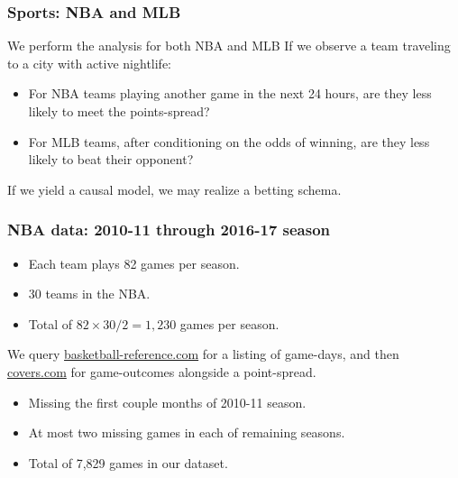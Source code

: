 \documentclass{beamer}
\begin{document}
  


\begin{frame}   \frametitle{Sports: NBA and MLB}
  \begin{block}{We perform the analysis for both NBA and MLB}     
    If we observe a team traveling to a city with active nightlife:
    \vspace{12pt}
    \begin{itemize}       \item For NBA teams playing another game in the next 24 hours, are they less likely to meet the points-spread?
      \item For MLB teams, after conditioning on the odds of winning, are they less likely to beat their opponent?     \end{itemize}
    \vspace{12pt}\begin{block}{If we yield a causal model, we may realize a betting schema.}     
\end{block}
  \end{block} 
\end{frame}

\begin{frame}   \frametitle{NBA data: 2010-11 through 2016-17 season}
  \begin{itemize}     \item Each team plays 82 games per season.
    \item 30 teams in the NBA.
    \item Total of $82 \times 30 / 2 = 1,230$ games per season.  
  \end{itemize}

  \vspace{12pt}We query \href{http://www.basketball-reference.com/leagues/}{basketball-reference.com}
  for a listing of game-days, and then 
  \href{http://www.covers.com/sports/NBA/matchups?selectedDate=2011-1-01}{covers.com} for 
  game-outcomes alongside a point-spread.

  \vspace{12pt}  
  \begin{itemize}     \item Missing the first couple months of 2010-11 season.
    \item At most two missing games in each of remaining seasons.
    \item Total of 7,829 games in our dataset.   \end{itemize}
\end{frame}
\end{document}
